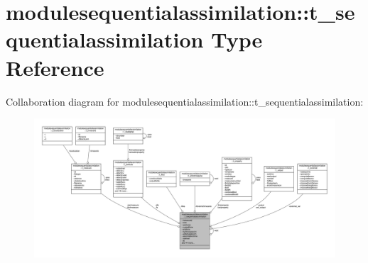 \hypertarget{structmodulesequentialassimilation_1_1t__sequentialassimilation}{}\section{modulesequentialassimilation\+:\+:t\+\_\+sequentialassimilation Type Reference}
\label{structmodulesequentialassimilation_1_1t__sequentialassimilation}


Collaboration diagram for modulesequentialassimilation\+:\+:t\+\_\+sequentialassimilation\+:\nopagebreak
\begin{figure}[H]
\begin{center}
\leavevmode
\includegraphics[width=350pt]{structmodulesequentialassimilation_1_1t__sequentialassimilation__coll__graph}
\end{center}
\end{figure}
